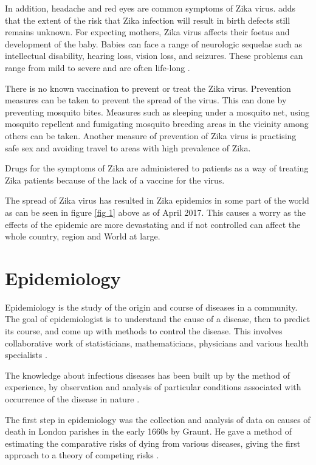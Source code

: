 In addition, headache and red eyes are common symptoms of Zika virus. \cite{simoes2016zika}  adds that the extent of the risk that Zika infection will result in birth defects still remains unknown. For expecting mothers, Zika virus affects their foetus and development of the baby. Babies can face a range of neurologic sequelae such as intellectual disability, hearing loss, vision loss, and seizures. These problems can range from mild to severe and are often life-long \citep{rasmussen2016zika}.

There is no known vaccination to prevent or treat the Zika virus. Prevention measures can be taken to prevent the spread of the virus. This can done by preventing mosquito bites. Measures such as sleeping under a mosquito net, using mosquito repellent and fumigating mosquito breeding areas in the vicinity among others can be taken. Another measure of prevention of Zika virus is practising safe sex and avoiding travel to areas with high prevalence of Zika.

Drugs for the symptoms of Zika are administered to patients as a way of treating Zika patients because of the lack of a vaccine for the virus.


The spread of Zika virus has resulted in Zika epidemics in some part of the world as can be seen in figure \ref{fig 1} above as of April 2017. This causes a worry as the effects of the epidemic are more devastating and if not controlled can affect the whole country, region and World at large. 


 \section{Epidemiology}
 
Epidemiology is the study of the origin and course of diseases in a community. The goal of epidemiologist is to understand the cause of a disease, then to predict its course, and come up with methods to control the disease. This involves collaborative work of statisticians, mathematicians, physicians and various health specialists \citep{Brauer2017}.

The knowledge about infectious diseases has been built up by the method of experience, by observation and analysis of particular conditions associated with occurrence of the disease in nature \citep{frost1923importance}.
 
The first step in epidemiology was the collection and analysis of data on causes of death in London parishes in the early 1660s by Graunt.
He  gave a method of estimating the comparative risks of dying from various diseases, giving the first approach to a theory of competing risks \citep{Brauer2017}.
 
